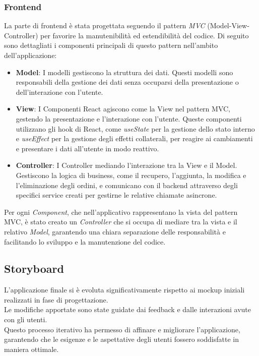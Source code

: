 \subsubsection{Frontend}
La parte di frontend è stata progettata seguendo il pattern \textit{MVC} (Model-View-Controller) per favorire la manutenibilità ed estendibilità del codice. Di seguito sono dettagliati i componenti principali di questo pattern nell'ambito dell'applicazione:

\begin{itemize}
    \item \textbf{Model}: I modelli gestiscono la struttura dei dati. Questi modelli sono responsabili della gestione dei dati senza occuparsi della presentazione o dell'interazione con l'utente.
    
    \item \textbf{View}: I Componenti React agiscono come la View nel pattern MVC, gestendo la presentazione e l'interazione con l'utente. Queste componenti utilizzano gli hook di React, come \textit{useState} per la gestione dello stato interno e \textit{useEffect} per la gestione degli effetti collaterali, per reagire ai cambiamenti e presentare i dati all'utente in modo reattivo.
    
    \item \textbf{Controller}: I Controller mediando l'interazione tra la View e il Model. Gestiscono la logica di business, come il recupero, l'aggiunta, la modifica e l'eliminazione degli ordini, e comunicano con il backend attraverso degli specifici service creati per gestirne le relative chiamate asincrone.
\end{itemize}

Per ogni \textit{Component}, che nell'applicativo rappresentano la vista del pattern MVC, è stato creato un \textit{Controller} che si occupa di mediare tra la vista e il relativo \textit{Model}, garantendo una chiara separazione delle responsabilità e facilitando lo sviluppo e la manutenzione del codice.

\subsection{Storyboard}

L'applicazione finale si è evoluta significativamente rispetto ai mockup iniziali realizzati in fase di progettazione.\\
Le modifiche apportate sono state guidate dai feedback e dalle interazioni avute con gli utenti.\\
Questo processo iterativo ha permesso di affinare e migliorare l'applicazione, garantendo che le esigenze e le
aspettative degli utenti fossero soddisfatte in maniera ottimale.

